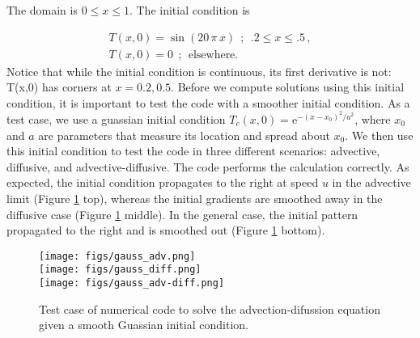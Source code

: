 \documentclass[11pt]{article}
\newcommand{\ee}{\mathrm{e}}
\begin{document}
The domain is $0 \leq x \leq 1$. The initial condition is

\begin{align}
    \label{Tini}
    T(x,0) = \sin\left(20 \, \pi \, x\right) \:\: ; \:\: .2 \leq x \leq .5 \, ,\nonumber \\ 
    T(x,0) = 0 \:\: ; \:\: \text{elsewhere} . 
\end{align}    
Notice that while the initial condition is continuous, its first derivative is not: T(x,0) has corners at $x = 0.2, 0.5$. Before we compute solutions using this initial condition, it is important to test the code with a smoother initial condition. As a test case, we use a guassian initial condition $T_c(x,0) = \ee^{- \left(x-x_0\right)^2/a^2}$, where $x_0$ and $a$ are parameters that measure its location and spread about $x_0$. We then use this initial condition to test the code in three different scenarios: advective, diffusive, and advective-diffusive. The code performs the calculation correctly. As expected, the initial condition propagates to the right at speed $u$ in the advective limit (Figure \ref{gaussian_test_case} top), whereas the initial gradients are smoothed away in the diffusive case (Figure \ref{gaussian_test_case} middle). In the general case, the initial pattern propagated to the right and is smoothed out (Figure \ref{gaussian_test_case} bottom).

\begin{figure}[p]
\begin{center}
    \texttt{[image: figs/gauss\_adv.png]}\\
    \texttt{[image: figs/gauss\_diff.png]}\\
    \texttt{[image: figs/gauss\_adv-diff.png]}
\end{center}    
\caption{Test case of numerical code to solve the advection-difussion equation given a smooth Guassian initial condition.}
\label{gaussian_test_case}
\end{figure}
\end{document}
